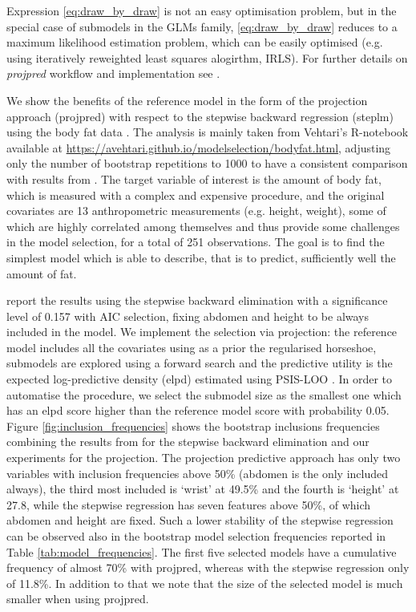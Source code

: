 \documentclass[american,]{article}
\theoremstyle{definition}
\begin{document}
Expression \eqref{eq:draw_by_draw} is not an easy optimisation problem, but in the special case of submodels in the GLMs family, \eqref{eq:draw_by_draw} reduces to a maximum likelihood estimation problem, which can be easily optimised (e.g. using iteratively reweighted least squares alogirthm, IRLS). For further details on \textit{projpred} workflow and implementation see \cite{paper:projpred}.

We show the benefits of the reference model in the form of the projection approach (projpred) with respect to the stepwise backward regression (steplm) using the body fat data \citep{johnson1996fitting}. The analysis is mainly taken from Vehtari's R-notebook available at \url{https://avehtari.github.io/modelselection/bodyfat.html}, adjusting only the number of bootstrap repetitions to 1000 to have a consistent comparison with results from \cite{paper:bodyfat}. The target variable of interest is the amount of body fat, which is measured with a complex and expensive procedure, and the original covariates are 13 anthropometric measurements (e.g. height, weight), some of which are highly correlated among themselves and thus provide some challenges in the model selection, for a total of 251 observations. The goal is to find the simplest model which is able to describe, that is to predict, sufficiently well the amount of fat. 

\cite{paper:bodyfat} report the results using the stepwise backward elimination with a significance level of 0.157 with AIC selection, fixing abdomen and height to be always included in the model. We implement the selection via projection: the reference model includes all the covariates using as a prior the regularised horseshoe, submodels are explored using a forward search and the predictive utility is the expected log-predictive density (elpd) estimated using PSIS-LOO \citep{paper:psis_loo}. In order to automatise the procedure, we select the submodel size as the smallest one which has an elpd score higher than the reference model score with probability 0.05. Figure \ref{fig:inclusion_frequencies} shows the bootstrap inclusions frequencies combining the results from \cite{paper:bodyfat} for the stepwise backward elimination and our experiments for the projection. The projection predictive approach has only two variables with inclusion frequencies above 50\% (abdomen is the only included always), the third most included is `wrist' at 49.5\% and the fourth is `height' at 27.8, while the stepwise regression has seven features above 50\%, of which abdomen and height are fixed. Such a lower stability of the stepwise regression can be observed also in the bootstrap model selection frequencies reported in Table \ref{tab:model_frequencies}. The first five selected models have a cumulative frequency of almost 70\% with projpred, whereas with the stepwise regression only of 11.8\%. In addition to that we note that the size of the selected model is much smaller when using projpred.
\end{document}
